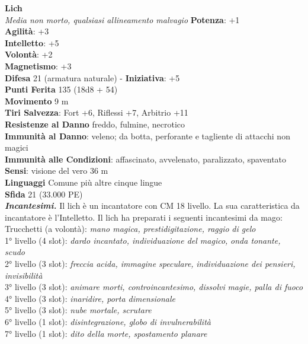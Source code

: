 \begin{multicols}{2}
\medskip\textbf{Lich}\\
\emph{Media non morto, qualsiasi allineamento malvagio}
\textbf{Potenza}: +1\\
\textbf{Agilità}: +3\\
\textbf{Intelletto}: +5\\
\textbf{Volontà}: +2\\
\textbf{Magnetismo}: +3\\
\textbf{Difesa} 21 (armatura naturale) - \textbf{Iniziativa}: +5\\
\textbf{Punti Ferita} 135 (18d8 + 54)\\
\textbf{Movimento} 9 m\\
\textbf{Tiri Salvezza}: Fort +6, Riflessi +7, Arbitrio +11\\
\textbf{Resistenze al Danno} freddo, fulmine, necrotico\\
\textbf{Immunità al Danno}: veleno; da botta, perforante e tagliente di attacchi non magici\\
\textbf{Immunità alle Condizioni}: affascinato, avvelenato, paralizzato, spaventato\\
\textbf{Sensi}: visione del vero 36 m\\
\textbf{Linguaggi} Comune più altre cinque lingue\\
\textbf{Sfida} 21 (33.000 PE)\smallskip\\
\emph{\textbf{Incantesimi.}} Il lich è un incantatore con CM 18 livello. La sua caratteristica da incantatore è l'Intelletto. Il lich ha preparati i seguenti incantesimi da mago:\\
Trucchetti (a volontà): \emph{mano magica, prestidigitazione, raggio} \emph{di gelo}\\
1° livello (4 slot): \emph{dardo incantato, individuazione del magico,} \emph{onda tonante, scudo}\\
2° livello (3 slot): \emph{freccia acida, immagine speculare,} \emph{individuazione dei pensieri, invisibilità}\\
3° livello (3 slot): \emph{animare morti, controincantesimo, dissolvi} \emph{magie, palla di fuoco}\\
4° livello (3 slot): \emph{inaridire, porta dimensionale}\\
5° livello (3 slot): \emph{nube mortale, scrutare}\\
6° livello (1 slot): \emph{disintegrazione, globo di invulnerabilità}\\
7° livello (1 slot): \emph{dito della morte, spostamento planare}\\

\end{multicols}
